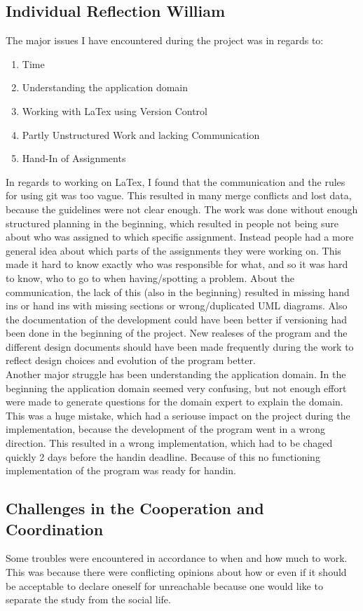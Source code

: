 \subsection{Individual Reflection William}
The major issues I have encountered during the project was in regards to:
\begin{enumerate}
	\item Time
	\item Understanding the application domain
	\item Working with LaTex using Version Control
	\item Partly Unstructured Work and lacking Communication
	\item Hand-In of Assignments
\end{enumerate}
In regards to working on LaTex, I found that the communication and the rules for using git was too vague. This resulted in many merge conflicts and lost data, because the guidelines were not clear enough.
The work was done without enough structured planning in the beginning, which resulted in people not being sure about who was assigned to which specific assignment. Instead people had a more general idea about which parts of the assignments they were working on. This made it hard to know exactly who was responsible for what, and so it was hard to know, who to go to when having/spotting a problem. About the communication, the lack of this (also in the beginning) resulted in missing hand ins or hand ins with missing sections or wrong/duplicated UML diagrams.
Also the documentation of the development could have been better if versioning had been done in the beginning of the project. New realeses of the program and the different design documents should have been made frequently during the work to reflect design choices and evolution of the program better.\\
Another major struggle has been understanding the application domain. In the beginning the application domain seemed very confusing, but not enough effort were made to generate questions for the domain expert to explain the domain. This was a huge mistake, which had a seriouse impact on the project during the implementation, because the development of the program went in a wrong direction. This resulted in a wrong implementation, which had to be chaged quickly 2 days before the handin deadline. Because of this no functioning implementation of the program was ready for handin.

\subsection{Challenges in the Cooperation and Coordination}
Some troubles were encountered in accordance to when and how much to work. This was because there were conflicting opinions about how or even if it should be acceptable to declare oneself for unreachable because one would like to separate the study from the social life.
\pagebreak

